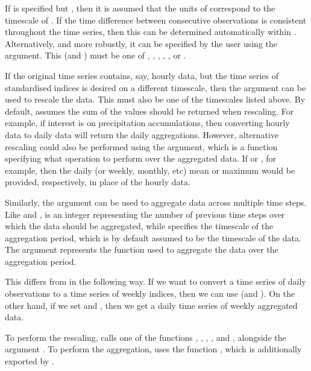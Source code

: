 \documentclass[article,shortnames,nojss]{jss}\usepackage[]{graphicx}\usepackage[]{xcolor}
\begin{document}
If  is specified but , then it is assumed that the units of  correspond to the timescale of . If the time difference between consecutive observations is consistent throughout the time series, then this can be determined automatically within . Alternatively, and more robustly, it can be specified by the user using the  argument. This (and ) must be one of , , , , , or .

If the original time series contains, say, hourly data, but the time series of standardised indices is desired on a different timescale, then the  argument can be used to rescale the data. This must also be one of the timescales listed above. By default,  assumes the sum of the values should be returned when rescaling. For example, if interest is on precipitation accumulations, then converting hourly data to daily data will return the daily aggregations. However, alternative rescaling could also be performed using the  argument, which is a function specifying what operation to perform over the aggregated data. If  or , for example, then the daily (or weekly, monthly, etc) mean or maximum would be provided, respectively, in place of the hourly data.

Similarly, the  argument can be used to aggregate data across multiple time steps. Like  and ,  is an integer representing the number of previous time steps over which the data should be aggregated, while  specifies the timescale of the aggregation period, which is by default assumed to be the timescale of the data. The argument  represents the function used to aggregate the data over the aggregation period.

This differs from  in the following way. If we want to convert a time series of daily observations to a time series of weekly indices, then we can use  (and ). On the other hand, if we set  and , then we get a daily time series of weekly aggregated data.

To perform the rescaling,  calls one of the  functions , , , , and , alongside the argument . To perform the aggregation,  uses the function , which is additionally exported by .
\end{document}
